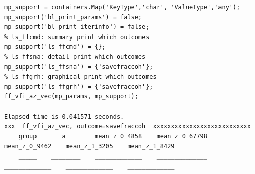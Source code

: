 \documentclass[
]{book}
\begin{document}
\begin{verbatim}
mp_support = containers.Map('KeyType','char', 'ValueType','any');
mp_support('bl_print_params') = false;
mp_support('bl_print_iterinfo') = false;
% ls_ffcmd: summary print which outcomes
mp_support('ls_ffcmd') = {};
% ls_ffsna: detail print which outcomes
mp_support('ls_ffsna') = {'savefraccoh'};
% ls_ffgrh: graphical print which outcomes
mp_support('ls_ffgrh') = {'savefraccoh'};
ff_vfi_az_vec(mp_params, mp_support);

Elapsed time is 0.041571 seconds.
xxx  ff_vfi_az_vec, outcome=savefraccoh  xxxxxxxxxxxxxxxxxxxxxxxxxxx
    group       a        mean_z_0_4858    mean_z_0_67798    mean_z_0_9462    mean_z_1_3205    mean_z_1_8429
    _____    ________    _____________    ______________    _____________    _____________    _____________


\end{verbatim}
\end{document}
